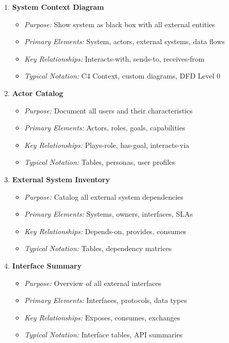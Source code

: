 \documentclass[11pt,letterpaper]{article}
\begin{document}
\begin{enumerate}[label=\textbf{MT\arabic*:}, leftmargin=2.5em]
    \item \textbf{System Context Diagram}
    \begin{itemize}[nosep]
        \item \textit{Purpose:} Show system as black box with all external entities
        \item \textit{Primary Elements:} System, actors, external systems, data flows
        \item \textit{Key Relationships:} Interacts-with, sends-to, receives-from
        \item \textit{Typical Notation:} C4 Context, custom diagrams, DFD Level 0
    \end{itemize}
    
    \item \textbf{Actor Catalog}
    \begin{itemize}[nosep]
        \item \textit{Purpose:} Document all users and their characteristics
        \item \textit{Primary Elements:} Actors, roles, goals, capabilities
        \item \textit{Key Relationships:} Plays-role, has-goal, interacts-via
        \item \textit{Typical Notation:} Tables, personas, user profiles
    \end{itemize}
    
    \item \textbf{External System Inventory}
    \begin{itemize}[nosep]
        \item \textit{Purpose:} Catalog all external system dependencies
        \item \textit{Primary Elements:} Systems, owners, interfaces, SLAs
        \item \textit{Key Relationships:} Depends-on, provides, consumes
        \item \textit{Typical Notation:} Tables, dependency matrices
    \end{itemize}
    
    \item \textbf{Interface Summary}
    \begin{itemize}[nosep]
        \item \textit{Purpose:} Overview of all external interfaces
        \item \textit{Primary Elements:} Interfaces, protocols, data types
        \item \textit{Key Relationships:} Exposes, consumes, exchanges
        \item \textit{Typical Notation:} Interface tables, API summaries
    \end{itemize}
    

\end{enumerate}
\end{document}

